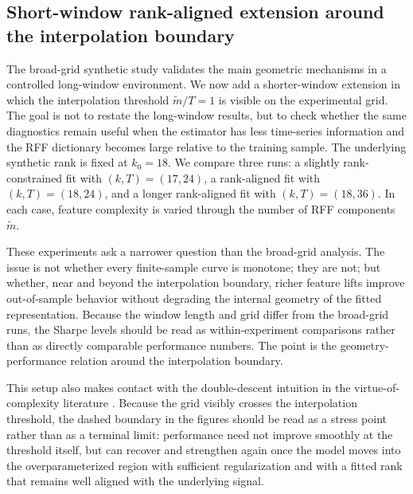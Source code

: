 \documentclass[11pt,letterpaper]{article}
\begin{document}
\subsection{Short-window rank-aligned extension around the interpolation boundary}
\label{sec:sim:shortwindow}

The broad-grid synthetic study validates the main geometric mechanisms in a controlled long-window environment. We now add a shorter-window extension in which the interpolation threshold $\tilde m/T=1$ is visible on the experimental grid. The goal is not to restate the long-window results, but to check whether the same diagnostics remain useful when the estimator has less time-series information and the RFF dictionary becomes large relative to the training sample. The underlying synthetic rank is fixed at $k_0=18$. We compare three runs: a slightly rank-constrained fit with $(k,T)=(17,24)$, a rank-aligned fit with $(k,T)=(18,24)$, and a longer rank-aligned fit with $(k,T)=(18,36)$. In each case, feature complexity is varied through the number of RFF components $\tilde m$.

These experiments ask a narrower question than the broad-grid analysis. The issue is not whether every finite-sample curve is monotone; they are not; but whether, near and beyond the interpolation boundary, richer feature lifts improve out-of-sample behavior without degrading the internal geometry of the fitted representation. Because the window length and grid differ from the broad-grid runs, the Sharpe levels should be read as within-experiment comparisons rather than as directly comparable performance numbers. The point is the geometry-performance relation around the interpolation boundary.

This setup also makes contact with the double-descent intuition in the virtue-of-complexity literature \cite{KMZ24,KM25}. Because the grid visibly crosses the interpolation threshold, the dashed boundary in the figures should be read as a stress point rather than as a terminal limit: performance need not improve smoothly at the threshold itself, but can recover and strengthen again once the model moves into the overparameterized region with sufficient regularization and with a fitted rank that remains well aligned with the underlying signal.
\end{document}
